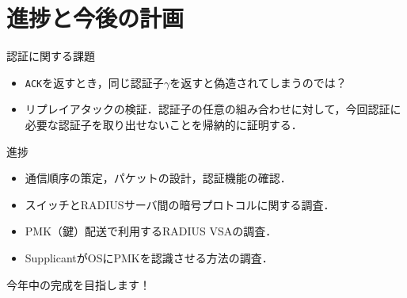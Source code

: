 \section{進捗と今後の計画}
\toc
\begin{frame}{\fft}
    \begin{alertblock}{認証に関する課題}
        \begin{itemize}
            \item[\cmark] \texttt{ACK}を返すとき，同じ認証子\(\gamma\)を返すと偽造されてしまうのでは？
            \item リプレイアタックの検証．認証子の任意の組み合わせに対して，今回認証に必要な認証子を取り出せないことを帰納的に証明する．
        \end{itemize}
    \end{alertblock}
    \vfill
    \begin{exampleblock}{進捗}
        \begin{itemize}
            \item[\cmark] 通信順序の策定，パケットの設計，認証機能の確認．
            \item スイッチとRADIUSサーバ間の暗号プロトコルに関する調査．
            \item PMK（鍵）配送で利用するRADIUS VSAの調査．
            \item SupplicantがOSにPMKを認識させる方法の調査．
        \end{itemize}
    \end{exampleblock}
    \hfill 今年中の完成を目指します！
\end{frame}
